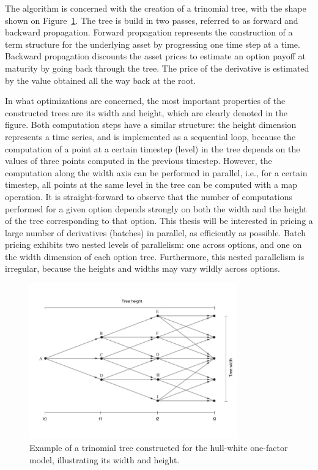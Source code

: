 The algorithm is concerned with the creation of a trinomial tree, with the shape shown on Figure~\ref{fig:intro:tree}. The tree is build in two passes, referred to as forward and backward propagation. Forward propagation represents the construction of a term structure for the underlying asset by progressing one time step at a time. Backward propagation discounts the asset prices to estimate an option payoff at maturity by going back through the tree. The price of the derivative is estimated by the value obtained all the way back at the root. 

In what optimizations are concerned, the most important properties of the constructed trees are its width and height, which are clearly denoted in the figure. Both computation steps have a similar structure: the height dimension represents a time series, and is implemented as a sequential loop, because the computation of a point at a certain timestep (level) in the tree depends on the values of three points computed in the previous timestep. However, the computation along the width axis can be performed in parallel, i.e., for a certain timestep, all points at the same level in the tree can be computed with a map operation. 
%
%
It is straight-forward to observe that the number of computations performed for a given option depends strongly on both the width and the height of the tree corresponding to that option. This thesis will be interested in pricing a large number of derivatives (batches) in parallel, as efficiently as possible. Batch pricing exhibits two nested levels of parallelism: one across options, and one on the width dimension of each option tree.   Furthermore, this nested parallelism is irregular, because the heights and widths may vary wildly across options. 

\begin{figure}[H]
	\centering
	\includegraphics[width=0.8\textwidth]{img/treeconststage1wh.jpg}
	\caption{Example of a trinomial tree constructed for the hull-white one-factor model, illustrating its width and height.}
	\label{fig:intro:tree}
\end{figure}

